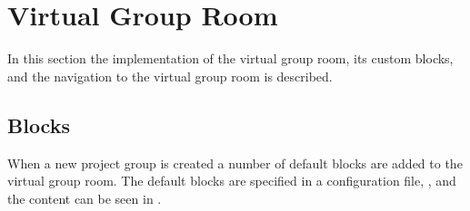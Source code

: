 \section{Virtual Group Room} %
\label{sec:projGroupRoomImpl}
In this section the implementation of the virtual group room, its custom blocks, and the navigation to the virtual group room is described. 





\subsection{Blocks}
\label{sec:implprojectgroupblocks}
\label{sub:membersblock}
When a new project group is created a number of default blocks are added to the virtual group room. 
The default blocks are specified in a configuration file, , and the content can be seen in .


